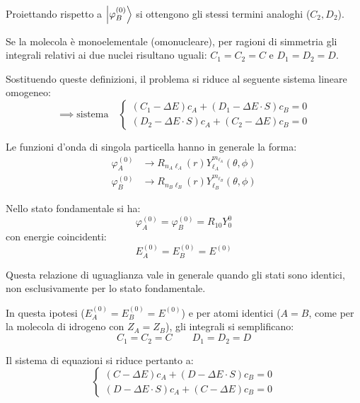 Proiettando rispetto a \( \ket{\varphi_B^{(0)}} \) si ottengono gli stessi termini analoghi (\( C_2, D_2 \)).

Se la molecola è monoelementale (omonucleare), per ragioni di simmetria gli integrali relativi ai due nuclei risultano uguali: \( C_1 = C_2 = C \) e \( D_1 = D_2 = D \).

Sostituendo queste definizioni, il problema si riduce al seguente sistema lineare omogeneo:
\begin{equation}
    \implies \text{sistema} \quad
    \begin{cases}
        (C_1 - \Delta E) c_A + (D_1 - \Delta E \cdot S) c_B = 0 \\[1.5ex]
        (D_2 - \Delta E \cdot S) c_A + (C_2 - \Delta E) c_B = 0
    \end{cases}
\end{equation}

Le funzioni d'onda di singola particella hanno in generale la forma:
\begin{align}
    \varphi_A^{(0)} &\longrightarrow R_{n_A \ell_A}(r) Y_{\ell_A}^{m_{\ell_A}}(\theta, \phi) \\[1.5ex]
    \varphi_B^{(0)} &\longrightarrow R_{n_B \ell_B}(r) Y_{\ell_B}^{m_{\ell_B}}(\theta, \phi)
\end{align}

Nello stato fondamentale si ha:
\begin{equation}
    \varphi_A^{(0)} = \varphi_B^{(0)} = R_{10} Y_0^0
\end{equation}
con energie coincidenti:
\begin{equation}
    E_A^{(0)} = E_B^{(0)} = E^{(0)}
\end{equation}

\begin{remark}
    Questa relazione di uguaglianza vale in generale quando gli stati sono identici, non esclusivamente per lo stato fondamentale.
\end{remark}

In questa ipotesi (\( E_A^{(0)} = E_B^{(0)} = E^{(0)} \)) e per atomi identici (\( A=B \), come per la molecola di idrogeno con \( Z_A = Z_B \)), gli integrali si semplificano:
\begin{equation}
    C_1 = C_2 = C \qquad D_1 = D_2 = D
\end{equation}

Il sistema di equazioni si riduce pertanto a:
\begin{equation}
    \begin{cases}
        (C - \Delta E) c_A + (D - \Delta E \cdot S) c_B = 0 \\[1.5ex]
        (D - \Delta E \cdot S) c_A + (C - \Delta E) c_B = 0
    \end{cases}
\end{equation}

